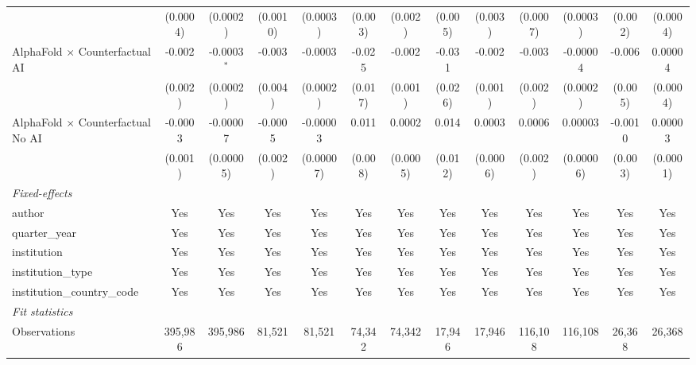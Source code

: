 \begin{tabular}{lcccccccccccc}
                                            & (0.0004)      & (0.0002)       & (0.0010) & (0.0003)     & (0.003) & (0.002)       & (0.005) & (0.003)      & (0.0007) & (0.0003)  & (0.002) & (0.0004)\\   
   AlphaFold $\times$ Counterfactual AI     & -0.002        & -0.0003$^{*}$  & -0.003   & -0.0003      & -0.025  & -0.002        & -0.031  & -0.002       & -0.003   & -0.00004  & -0.006  & 0.00004\\   
                                            & (0.002)       & (0.0002)       & (0.004)  & (0.0002)     & (0.017) & (0.001)       & (0.026) & (0.001)      & (0.002)  & (0.0002)  & (0.005) & (0.0004)\\   
   AlphaFold $\times$ Counterfactual No AI  & -0.0003       & -0.00007       & -0.0005  & -0.00003     & 0.011   & 0.0002        & 0.014   & 0.0003       & 0.0006   & 0.00003   & -0.0010 & 0.00003\\   
                                            & (0.001)       & (0.00005)      & (0.002)  & (0.00007)    & (0.008) & (0.0005)      & (0.012) & (0.0006)     & (0.002)  & (0.00006) & (0.003) & (0.0001)\\   
   \midrule
   \emph{Fixed-effects}\\
   author                                   & Yes           & Yes            & Yes      & Yes          & Yes     & Yes           & Yes     & Yes          & Yes      & Yes       & Yes     & Yes\\  
   quarter\_year                            & Yes           & Yes            & Yes      & Yes          & Yes     & Yes           & Yes     & Yes          & Yes      & Yes       & Yes     & Yes\\  
   institution                              & Yes           & Yes            & Yes      & Yes          & Yes     & Yes           & Yes     & Yes          & Yes      & Yes       & Yes     & Yes\\  
   institution\_type                        & Yes           & Yes            & Yes      & Yes          & Yes     & Yes           & Yes     & Yes          & Yes      & Yes       & Yes     & Yes\\  
   institution\_country\_code               & Yes           & Yes            & Yes      & Yes          & Yes     & Yes           & Yes     & Yes          & Yes      & Yes       & Yes     & Yes\\  
   \midrule
   \emph{Fit statistics}\\
   Observations                             & 395,986       & 395,986        & 81,521   & 81,521       & 74,342  & 74,342        & 17,946  & 17,946       & 116,108  & 116,108   & 26,368  & 26,368\\  

\end{tabular}
